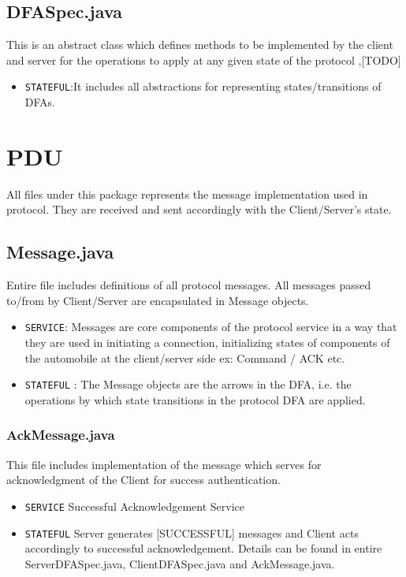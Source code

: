 \documentclass[12pt]{usenixsubmit}
\begin{document}
\subsection{DFASpec.java}This is an abstract class which defines methods to be implemented by the client and server for the operations to apply at any given state of the protocol ,[TODO]
\begin{itemize}
  \item {\tt STATEFUL}:It includes all abstractions for representing states/transitions of DFAs.
\end{itemize}

  \section{PDU} All files under this package represents the message implementation used in protocol. They are received and sent accordingly with the Client/Server's state.

     \subsection{Message.java} Entire file includes definitions of all protocol messages. All messages passed to/from by Client/Server are encapsulated in Message objects.
     \begin{itemize}
     \item {\tt SERVICE}:  Messages are core components of the protocol service in a way that they are used in initiating a connection, initializing states of components of the automobile at the client/server side ex: Command / ACK  etc.
     \item {\tt STATEFUL} : The Message objects are the arrows in the DFA, i.e. the operations by which state transitions in the protocol DFA are applied.
     \end{itemize}
\subsubsection{AckMessage.java} This file includes implementation of the message which serves for acknowledgment of the Client for success authentication.
     \begin{itemize}
     \item {\tt SERVICE} Successful Acknowledgement Service
     \item {\tt STATEFUL} Server generates [SUCCESSFUL] messages and Client acts accordingly to successful acknowledgement. Details can be found in entire ServerDFASpec.java, ClientDFASpec.java and AckMessage.java.
     \end{itemize}
\end{document}
